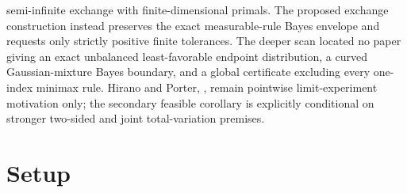 \documentclass{article}
\begin{document}
semi-infinite exchange with finite-dimensional primals. The proposed exchange construction instead preserves the exact measurable-rule Bayes envelope and requests only strictly positive finite tolerances. The deeper scan located no paper giving an exact unbalanced least-favorable endpoint distribution, a curved Gaussian-mixture Bayes boundary, and a global certificate excluding every one-index minimax rule. Hirano and Porter, \cite{HiranoPorter2009}, remain pointwise limit-experiment motivation only; the secondary feasible corollary is explicitly conditional on stronger two-sided and joint total-variation premises.

\section{Setup}
\end{document}
